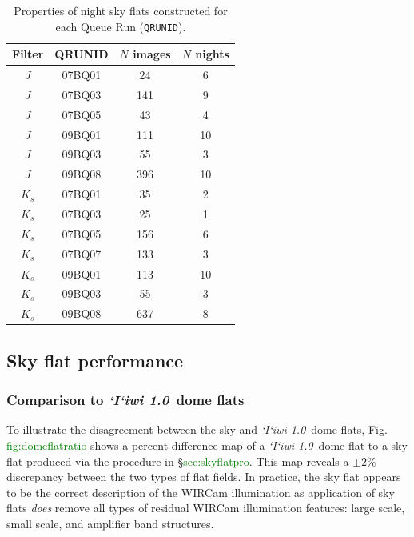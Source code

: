 \documentclass[iop]{emulateapj}
\newcommand{\sw}[1]{\textit{#1}} %
\newcommand{\iiwione}{\sw{`I`iwi 1.0}}
\newcommand{\todo}[1]{\textcolor{green}{#1}}
\begin{document}
\begin{table}[t]
    \centering
    \caption{Properties of night sky flats constructed for each Queue Run (\texttt{QRUNID}).}
    \label{tab:flattable}

\begin{tabular}{cccc}
\hline
Filter & QRUNID & $N$ images & $N$ nights \\
\hline
$J$ & 07BQ01 & 24 & 6 \\
$J$ & 07BQ03 & 141 & 9 \\
$J$ & 07BQ05 & 43 & 4 \\
$J$ & 09BQ01 & 111 & 10 \\
$J$ & 09BQ03 & 55 & 3 \\
$J$ & 09BQ08 & 396 & 10 \\
\hline
$K_s$ & 07BQ01 & 35 & 2 \\
$K_s$ & 07BQ03 & 25 & 1 \\
$K_s$ & 07BQ05 & 156 & 6 \\
$K_s$ & 07BQ07 & 133 & 3 \\
$K_s$ & 09BQ01 & 113 & 10 \\
$K_s$ & 09BQ03 & 55 & 3 \\
$K_s$ & 09BQ08 & 637 & 8 \\
\hline
\end{tabular}
\end{table}

\subsection{Sky flat performance}
\label{sec:skyflatstats}


\subsubsection{Comparison to \iiwione\ dome flats}


To illustrate the disagreement between the sky and \iiwione\ dome flats, Fig. \todo{fig:domeflatratio} shows a percent difference map of a \iiwione\ dome flat to a sky flat produced via the procedure in \S \todo{sec:skyflatpro}. This map reveals a $\pm2\%$ discrepancy between the two types of flat fields.
In practice, the sky flat appears to be the correct description of the WIRCam illumination as application of sky flats \emph{does} remove all types of residual WIRCam illumination features: large scale, small scale, and amplifier band structures.
\end{document}
